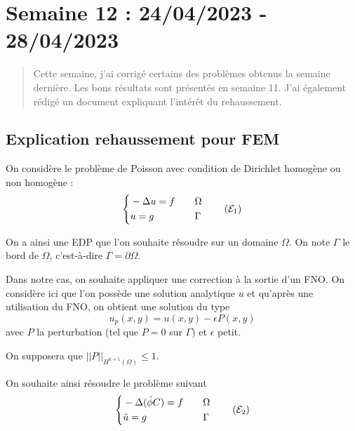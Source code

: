 \section{Semaine 12 : 24/04/2023 - 28/04/2023}
\graphicspath{{semaines/semaine_12/images/}}

\begin{abstract}
	Cette semaine, j'ai corrigé certains des problèmes obtenus la semaine dernière. Les bons résultats sont présentés en semaine 11. J'ai également rédigé un document expliquant l'intérêt du rehaussement.
\end{abstract}

\setlength\parindent{0pt}

\subsection{Explication rehaussement pour FEM \faBookmarkO}

	On considère le problème de Poisson avec condition de Dirichlet homogène ou non homogène :
\begin{equation}
	\label{pb1}
	\left\{\begin{aligned}
		&-\Delta u=f \quad &&\Omega \\
		&u=g \quad &&\Gamma
	\end{aligned}\right. \tag{$\mathcal{E}_1$}
\end{equation}

On a ainsi une EDP que l'on souhaite résoudre sur un domaine $\Omega$. On note $\Gamma$ le bord de $\Omega$, c'est-à-dire $\Gamma=\partial\Omega$. 

Dans notre cas, on souhaite appliquer une correction à la sortie d'un FNO.
On considère ici que l'on possède une solution analytique $u$ et qu'après une utilisation du FNO, on obtient une solution du type
\begin{equation}
	\label{phi_tild}
	u_p(x,y) = u(x,y)-\epsilon P(x,y)
\end{equation}
avec $P$ la perturbation (tel que $P=0$ sur $\Gamma$) et $\epsilon$ petit.

On supposera que $||P||_{H^{k+1}(\Omega)}\le 1$.

On souhaite ainsi résoudre le problème suivant
\begin{equation}
	\label{pb2}
	\left\{\begin{aligned}
		&-\Delta (\tilde{\phi}C)=f \quad &&\Omega \\
		&\tilde{u}=g \quad &&\Gamma
	\end{aligned}\right. \tag{$\mathcal{E}_2$}
\end{equation}

